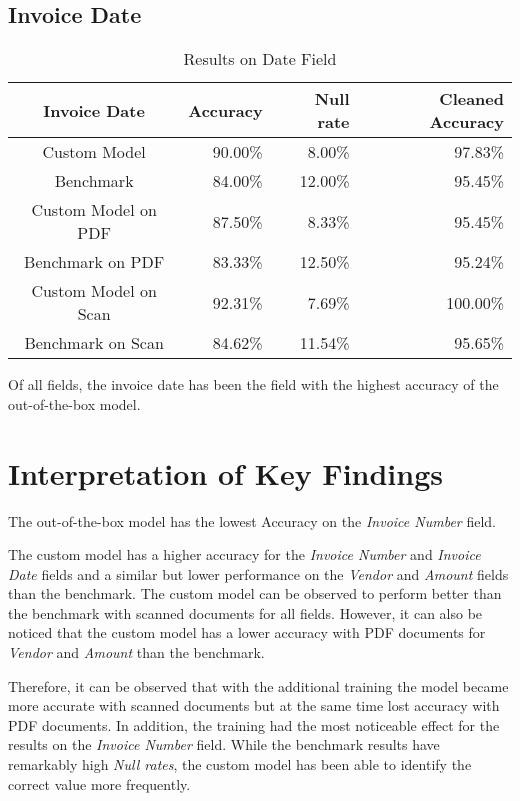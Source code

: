 \subsection*{Invoice Date}
\begin{table}[ht]   %
    \centering
    \footnotesize
    \begin{tabular}{c|rrr} %
        \toprule    %
        Invoice Date  & Accuracy  & Null rate & Cleaned Accuracy \\
        \midrule    %
        Custom Model               & 90.00\%   & 8.00\%   & 97.83\% \\
        Benchmark           & 84.00\%   & 12.00\%  & 95.45\%\\
        \midrule    %
        Custom Model on PDF        & 87.50\%   & 8.33\%  & 95.45\% \\
        Benchmark on PDF    & 83.33\%   & 12.50\%  & 95.24\% \\
        \midrule    %
        Custom Model on Scan       & 92.31\%  & 7.69\%   & 100.00\% \\
        Benchmark on Scan   & 84.62\%  & 11.54\%  & 95.65\% \\

        \bottomrule %
    \end{tabular}
    \caption{Results on Date Field}
    \label{table:Model_Bench_Date}
\end{table}

Of all fields, the invoice date has been the field with the highest accuracy of the out-of-the-box model.

\newpage
\section{Interpretation of Key Findings}
The out-of-the-box model has the lowest Accuracy on the \textit{Invoice Number} field.


The custom model has a higher accuracy for the \textit{Invoice Number} and \textit{Invoice Date} fields and a similar but lower performance on the \textit{Vendor} and \textit{Amount} fields than the benchmark.
The custom model can be observed to perform better than the benchmark with scanned documents for all fields. However, it can also be noticed that the custom model has a lower accuracy with PDF documents for \textit{Vendor} and \textit{Amount} than the benchmark.

Therefore, it can be observed that with the additional training the model became more accurate with scanned documents but at the same time lost accuracy with PDF documents. In addition, the training had the most noticeable effect for the results on the \textit{Invoice Number} field. While the benchmark results have remarkably high \textit{Null rates}, the custom model has been able to identify the correct value more frequently.